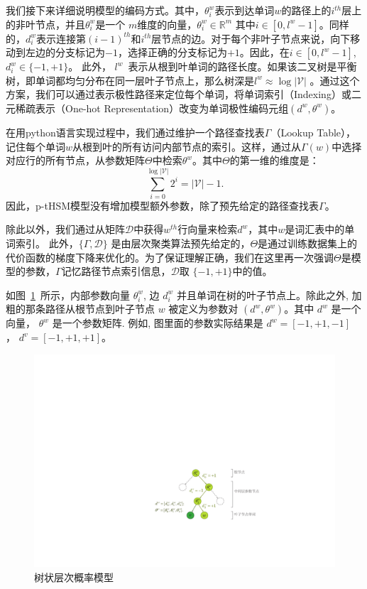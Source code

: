 我们接下来详细说明模型的编码方式。其中，$ \theta_i ^ w $表示到达单词$w$的路径上的$ i^{th} $层上的非叶节点，并且$\theta_i ^ w$是一个 $m$维度的向量，$ \theta_i ^ w \in\mathbb{R}^m $ 其中$ i \in [0, l ^ w - 1] $。同样的，$ d_i ^ w $表示连接第$(i-1)^ {th} $和$ i ^ {th} $层节点的边。对于每个非叶子节点来说，向下移动到左边的分支标记为$ -1 $，选择正确的分支标记为$ + 1 $。因此，在$i\in[0,l^w-1]$, $d_i^w\in \{-1,+1\}$。 此外， $l^w$~表示从根到叶单词的路径长度。如果该二叉树是平衡树，即单词都均匀分布在同一层叶子节点上，那么树深是$l^w\approx \log \mathcal{|V|}$ 。通过这个方案，我们可以通过表示极性路径来定位每个单词，将单词索引（Indexing）或二元稀疏表示（One-hot Representation）改变为单词极性编码元组$(d ^ w,\theta ^ w)$。


在用python语言实现过程中，我们通过维护一个路径查找表$\Gamma$（Lookup Table），记住每个单词$ w $从根到叶的所有访问内部节点的索引。这样，通过从$ \Gamma(w)$中选择对应行的所有节点，从参数矩阵${\Theta} $中检索$ \theta ^ w $。其中${\Theta} $的第一维的维度是：
\begin{equation}\label{equ:sums}
\sum_{i=0}^{\log \mathcal{|V|}}{2^i} = \mathcal{|V|} -1.
\end{equation}
因此，p-tHSM模型没有增加模型额外参数，除了预先给定的路径查找表$ \Gamma $。

除此以外，我们通过从矩阵$\mathcal{D}$中获得$w^{th} $行向量来检索$d^w$，其中$w$是词汇表中的单词索引。 此外，$\{\Gamma,\mathcal{D}\}$ 是由层次聚类算法预先给定的，$\Theta$是通过训练数据集上的代价函数的梯度下降来优化的。为了保证理解正确，我们在这里再一次强调$ \Theta $是模型的参数，$ \Gamma $记忆路径节点索引信息，$\mathcal {D}$取 $ \{ - 1,+1 \} $中的值。

如图~\ref{fig:tree_hsm}~所示，内部参数向量 $\theta_i^w$, 边 $d_i^w$ 并且单词在树的叶子节点上。除此之外, 加粗的那条路径从根节点到叶子节点 $w$ 被定义为参数对 $(d^w,\theta^w)$。其中 $d^w$ 是一个向量， $\theta^w$ 是一个参数矩阵. 例如, 图里面的参数实际结果是 $d^w=[-1,+1,-1]$ ， $d^{v}=[-1,+1,+1]$。
\begin{figure}[!h]
  \centering
    \includegraphics[width=0.8\linewidth]{./figures/thsm.pdf}
\caption{树状层次概率模型}\label{fig:tree_hsm} %
\end{figure}

